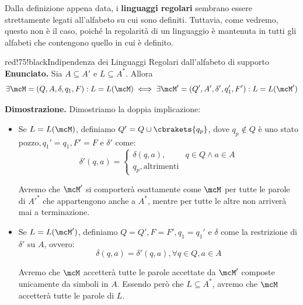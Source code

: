 
Dalla definizione appena data, i \textbf{linguaggi regolari} sembrano essere strettamente legati all'alfabeto su cui sono definiti. Tuttavia, come vedremo, questo non è il caso, poiché la regolarità di un linguaggio è mantenuta in tutti gli alfabeti che contengono quello in cui è definito.

\begin{halfframedbox}{red!75!black}{Indipendenza dei Linguaggi Regolari dall'alfabeto di supporto}
  \textbf{Enunciato. } Sia \(A \subseteq A'\) e \(L \subseteq A^*\). Allora
  \begin{equation}
    \exists\mcM=(Q,A,\delta,q_1,F):L=L(\mcM) \iff \exists\mcM'=(Q', A', \delta', q_1', F'):L=L(\mcM')
  \end{equation}

  \begin{center}
    \textcolor{red!75!black}{\hdashrule[0.5ex]{18cm}{1pt}{3mm 3pt 1mm 2pt}}
  \end{center}

  \textbf{Dimostrazione. } Dimostriamo la doppia implicazione:
  \begin{itemize}
    \item[``\(\Rightarrow\)''] Se \(L=L(\mcM) \), definiamo \(Q'=Q\cup\cbrakets{q_p}\), dove \(q_p \nin Q\) è uno stato pozzo\(, q_1'=q_1, F'=F\) e \(\delta'\) come:
    \begin{equation}
      \delta'(q,a)=\begin{cases}
        \delta(q,a), & q \in Q \land a \in A\\
        q_p, \text{altrimenti}
      \end{cases}
    \end{equation}

    Avremo che \(\mcM'\) si comporterà esattamente come \(\mcM\) per tutte le parole di \(A'^*\) che appartengono anche a \(A^*\), mentre per tutte le altre non arriverà mai a terminazione.
    \item[``\(\Leftarrow\)''] Se \(L=L(\mcM')\), definiamo \(Q=Q', F=F', q_1=q_1'\) e \(\delta\) come la restrizione di \(\delta'\) su \(A\), ovvero:
    \begin{equation}
      \delta(q,a)=\delta'(q,a), \forall q \in Q, a \in A
    \end{equation}

    Avremo che \(\mcM\) accetterà tutte le parole accettate da \(\mcM'\) composte unicamente da simboli in \(A\). Essendo però che \(L\subseteq A^*\), avremo che \(\mcM\) accetterà tutte le parole di \(L\).
  \end{itemize}
\end{halfframedbox}

